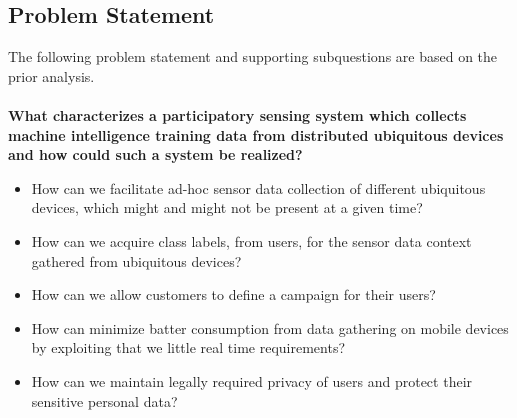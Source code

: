 \subsection{Problem Statement}
\label{sub:problem_statement}


The following problem statement and supporting subquestions are based on the prior analysis.
\\\\
\textbf{What characterizes a participatory sensing system which collects machine intelligence training data from distributed ubiquitous devices and how could such a system be realized?}

\begin{itemize}
    \item How can we facilitate ad-hoc sensor data collection of different ubiquitous devices, which might and might not be present at a given time?
    \item How can we acquire class labels, from users, for the sensor data context gathered from ubiquitous devices?  
    \item How can we allow customers to define a campaign for their users?
    \item How can minimize batter consumption from data gathering on mobile devices by exploiting that we little real time requirements?
    \item How can we maintain legally required privacy of users and protect their sensitive personal data? 
\end{itemize}

